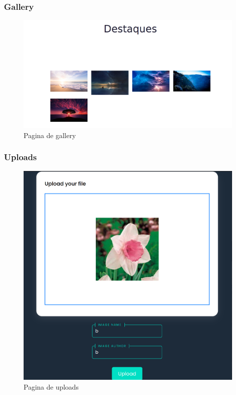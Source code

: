 \documentclass{report}
\begin{document}
\subsubsection{Gallery}

\begin{figure}[H]
    \centering
    \includegraphics[scale=0.2]{../images/gallery}
    \caption{Pagina de gallery}
    \label{fig:galley }
\end{figure}

\subsubsection{Uploads}

\begin{figure}[H]
    \centering
    \includegraphics[scale=0.2]{../images/uploads}
    \caption{Pagina de uploads}
    \label{fig:uploads}
\end{figure}
\end{document}
